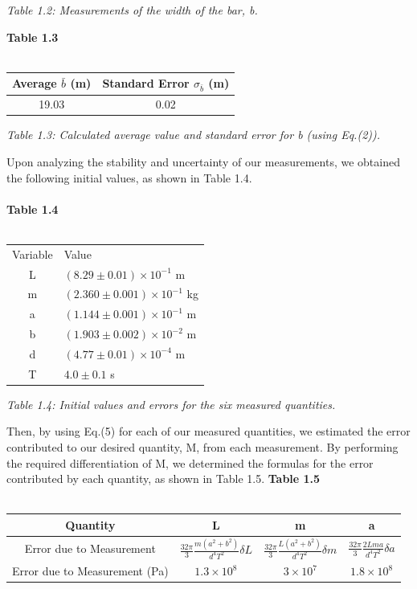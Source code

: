 \documentclass[leqno]{article}
\begin{document}
\begin{flushleft}
\textit{\small Table 1.2: Measurements of the width of the bar, b.}
\end{flushleft}
\textbf{Table 1.3}\\\\
\begin{tabular}{|c|c|}
	\hline
	Average $\bar{b}$ (m) & Standard Error $\sigma_{\bar{b}}$ (m)\\
	\hline
	19.03 & 0.02\\
	\hline
\end{tabular}
\begin{flushleft}
\textit{\small Table 1.3: Calculated average value and standard error for b (using Eq.(2)).}
\end{flushleft}
Upon analyzing the stability and uncertainty of our measurements, we obtained the following initial values, as shown in Table 1.4.\\\\
\textbf{Table 1.4}\\\\
\begin{tabular}{c|l}
Variable & Value\\
L & $(8.29\pm0.01)\times10^{-1}$ m\\
m & $(2.360\pm0.001)\times 10^{-1}$ kg\\
a & $(1.144\pm0.001)\times10^{-1}$ m\\
b & $(1.903\pm0.002)\times10^{-2}$ m\\
d & $(4.77\pm0.01)\times10^{-4}$ m\\
T & $4.0 \pm 0.1$ s\\
\end{tabular}
\begin{flushleft}
\textit{\small Table 1.4: Initial values and errors for the six measured quantities.}
\end{flushleft}
Then, by using Eq.(5) for each of our measured quantities, we estimated the error contributed to our desired quantity, M, from each measurement.
By performing the required differentiation of M, we determined the formulas for the error contributed by each quantity, as shown in Table 1.5.\newpage
\textbf{Table 1.5}\\\\
\begin{tabular}{|c|c|c|c|}
	\hline
	Quantity & L & m & a\\
	\hline
	Error due to Measurement& $\frac{32\pi}{3}\frac{m(a^2+b^2)}{d^4 T^2}\delta L$ & $\frac{32\pi}{3}\frac{L(a^2+b^2)}{d^4 T^2}\delta m$ & $\frac{32\pi}{3}\frac{2Lma}{d^4 T^2}\delta a$  \\
\hline
Error due to Measurement (Pa)& $1.3\times10^8$ & $3\times10^7$ & $1.8\times10^8$\\
\hline
\end{tabular}\\\\\\
\end{document}
